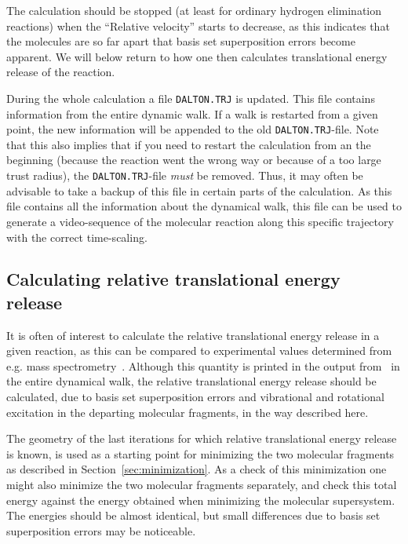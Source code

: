 The calculation should be stopped (at least for ordinary hydrogen
elimination reactions) when the ``Relative velocity'' starts to
decrease, as this indicates that the molecules are so far apart that
basis set superposition errors
become apparent. We will below return to how 
one then calculates translational energy release of the reaction.

During the whole calculation a file
\texttt{DALTON.TRJ} is updated. This 
file contains information from the entire dynamic walk. If a
walk is restarted from a given point, the new information will be
appended to the old \texttt{DALTON.TRJ}-file. Note that this also implies
that if you need to restart the calculation from an the beginning
(because the reaction went the wrong way or because of a too large trust
radius), the 
\texttt{DALTON.TRJ}-file {\em must} be removed. Thus, it may often be
advisable to take a backup of this file in certain parts of the
calculation. As this file contains all the information about the
dynamical walk, this file can be used to generate a video-sequence of
the molecular reaction along this specific trajectory with the correct
time-scaling. 

\subsection{Calculating relative translational energy release}

It is often of interest to calculate the relative translational energy
release in a given reaction, as this can be compared to experimental
values determined from e.g. mass
spectrometry~\cite{theuhjajcpl173}. Although
this quantity 
is printed in the output from \siraba\ in the entire dynamical walk, the
relative translational energy release should be calculated, due to
basis set superposition errors and
vibrational and rotational
excitation in the departing molecular
fragments, in the way described here. 

The geometry of the last iterations for which relative translational
energy release is known, is used as a starting point for minimizing
the two molecular fragments as described in
Section~\ref{sec:minimization}. As a check of this minimization one
might also minimize the two molecular fragments separately, and check
this total energy against the energy obtained when minimizing the
molecular supersystem. The energies should be almost identical, but
small differences due to basis set superposition errors may be
noticeable.

